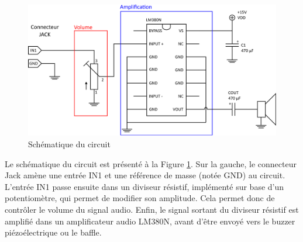 \begin{figure}[!ht]
	\centering
	\includegraphics[width=.7\textwidth]{figures/schematics.eps}
	\caption{Schématique du circuit}
	\label{fig:schematics}
\end{figure}

Le schématique du circuit est présenté à la Figure \ref{fig:schematics}. Sur la gauche, le connecteur Jack amène une entrée IN1 et une référence de masse (notée GND) au circuit. L'entrée IN1 passe ensuite dans un diviseur résistif, implémenté sur base d'un potentiomètre, qui permet de modifier son amplitude. Cela permet donc de contrôler le volume du signal audio. Enfin, le signal sortant du diviseur résistif est amplifié dans un amplificateur audio LM380N, avant d'être envoyé vers le buzzer piézoélectrique ou le baffle.